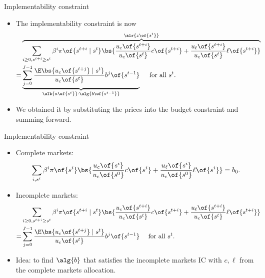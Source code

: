 \documentclass[11pt,xcolor={dvipsnames},aspectratio=159,hyperref={pdftex,pdfpagemode=UseNone,hidelinks,pdfdisplaydoctitle=true},usepdftitle=false]{beamer}
\begin{document}
\begin{frame}{Implementability constraint}
        
        \begin{itemize}
            \item The implementability constraint is now
        \begin{align*}  
            &\overbrace{\sum_{i\geq0,s^{t+i}\geq s^t} \beta^i \pi\of{s^{t+i} \mid s^t} \bs{\frac{u_c\of{s^{t+i}}}{u_c\of{s^t}} c\of{s^{t+i}} + \frac{u_\ell\of{s^{t+i}}}{u_c\of{s^t}} \ell\of{s^{t+i}}  }}^{\alr{z\of{s^t}}} &\\ 
            = &\underbrace{\sum_{j=0}^{J-1} \frac{\E \bs{u_c\of{s^{t+j}}\mid s^t}}{u_c\of{s^t}} b^j\of{s^{t-1}}}_{\alb{a\of{s^t}} \cdot \alg{b\of{s^{t-1}}}} \quad \text{ for all } s^t.& 
        \end{align*}
        
        \item We obtained it by substituting the prices into the budget constraint and summing forward.
        \end{itemize}
\end{frame}

\begin{frame}{Implementability constraint}
    \begin{itemize}
        \item Complete markets:
        \begin{align*}
            \sum_{i,s^i} \beta^i \pi\of{s^i} \bs{\frac{u_c\of{s^i}}{u_c\of{s^0}}c\of{s^i} + \frac{u_\ell\of{s^i}}{u_c\of{s^0}} \ell\of{s^i}} = b_0.
        \end{align*}
        \item Incomplete markets:
        \begin{align*}  
            &\sum_{i\geq0,s^{t+i}\geq s^t} \beta^i \pi\of{s^{t+i} \mid s^t} \bs{\frac{u_c\of{s^{t+i}}}{u_c\of{s^t}} c\of{s^{t+i}} + \frac{u_\ell\of{s^{t+i}}}{u_c\of{s^t}} \ell\of{s^{t+i}}  } &\\ 
            = &\sum_{j=0}^{J-1} \frac{\E \bs{u_c\of{s^{t+j}}\mid s^t}}{u_c\of{s^t}} b^j\of{s^{t-1}} \quad \text{ for all } s^t.& 
        \end{align*}
        \item Idea: to find $\alg{b}$ that satisfies the incomplete markets IC with ${c,\ell}$ from the complete markets allocation.
    \end{itemize}
\end{frame}
\end{document}
